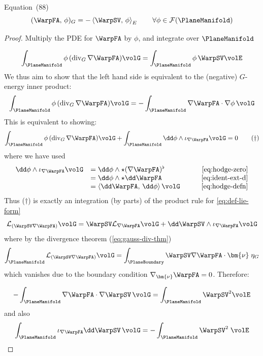 \begin{proposition}
\label{prop:FA88}
\cite{armero2021modeling} Equation~(88)
\begin{equation}
(\WarpFA,\, \phi)_G = - \left<\WarpSV,\, \phi\right>_E
\qquad \forall \phi \in \mathcal{F}(\PlaneManifold)
\label{eq:FA88}
\end{equation}
\end{proposition}
\begin{proof}
Multiply the PDE for $\WarpFA$ by $\phi$, and integrate over $\PlaneManifold$

$$
\int_{\PlaneManifold} \phi \, (\operatorname{div}_{G}\nabla \WarpFA)  \volG 
= \int_{\PlaneManifold} \phi \, \WarpSV \volE
$$
We thus aim to show that the left hand side is equivalent to the (negative) $G$-energy inner product:
$$
\int_{\PlaneManifold} \phi\, (\operatorname{div}_{G} \nabla \WarpFA) \volG
=- \int_{\PlaneManifold} \nabla \WarpFA \cdot \nabla \phi \, \volG 
$$
This is equivalent to showing:
\begin{equation}
\int_{\PlaneManifold} \phi\, (\operatorname{div}_{G} \nabla \WarpFA) \volG
+ \int_{\PlaneManifold} \dd \phi \wedge \interior{\nabla \WarpFA}{\volG} = 0
\tag{$\dagger$}
\end{equation}
where we have used 
\[
\begin{array}{rlr}
\dd \phi \wedge \interior{\nabla \WarpFA}{\volG} 
&= \dd \phi \wedge \star (\nabla \WarpFA)^{\flat}  & \qquad \text{\eqref{eq:hodge-zero}}\\
&= \dd \phi \wedge \star     \dd \WarpFA &  \qquad \text{\eqref{eq:ident-ext-d}} \\
&= \left<\dd \WarpFA,\, \dd \phi \right> \volG & \qquad \text{\eqref{eq:hodge-defn}} \\
\end{array}
\]
Thus (\(\dagger\)) is exactly an integration (by parts) of the product rule for \eqref{eq:def-lie-form}
\[
\mathcal{L}_{(\WarpSV \nabla \WarpFA)} \volG = \WarpSV \mathcal{L}_{\nabla \WarpFA}\volG + \dd \WarpSV \wedge \interior{\nabla \WarpFA}{\volG}
\]
where by the divergence theorem (\eqref{eq:gauss-div-thm})
\[
\int_{\PlaneManifold} \mathcal{L}_{(\WarpSV \nabla \WarpFA)} \volG =
\int_{\PlaneBoundary} \WarpSV  \nabla \WarpFA \cdot \bm{\nu} \; \eta_G
\]
which vanishes due to the boundary condition \(\nabla_{\bm{\nu}} \WarpFA = 0\). 
Therefore:

$$
-\int_{\PlaneManifold} \nabla \WarpFA \cdot \nabla \WarpSV \, \volG
= \int_{\PlaneManifold} \WarpSV^2 \volE
$$
and also
$$
\int_{\PlaneManifold} \interior{\nabla\WarpFA}{\dd \WarpSV}\,\volG
=
- \int_{\PlaneManifold} \WarpSV^2 \; \volE
$$

\end{proof}
